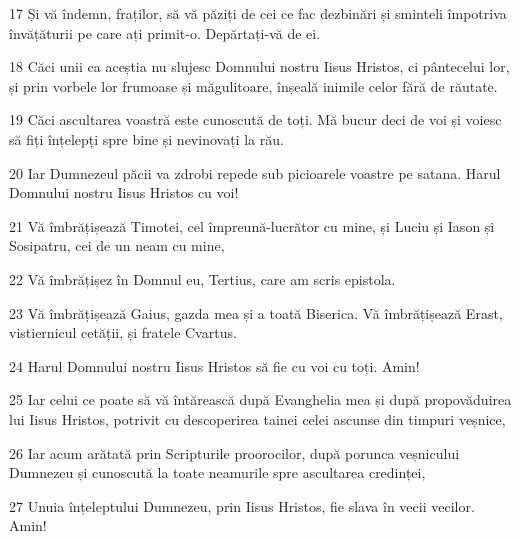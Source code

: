 \par 17 Și vă îndemn, fraților, să vă păziți de cei ce fac dezbinări și sminteli împotriva învățăturii pe care ați primit-o. Depărtați-vă de ei.
\par 18 Căci unii ca aceștia nu slujesc Domnului nostru Iisus Hristos, ci pântecelui lor, și prin vorbele lor frumoase și măgulitoare, înșeală inimile celor fără de răutate.
\par 19 Căci ascultarea voastră este cunoscută de toți. Mă bucur deci de voi și voiesc să fiți înțelepți spre bine și nevinovați la rău.
\par 20 Iar Dumnezeul păcii va zdrobi repede sub picioarele voastre pe satana. Harul Domnului nostru Iisus Hristos cu voi!
\par 21 Vă îmbrățișează Timotei, cel împreună-lucrător cu mine, și Luciu și Iason și Sosipatru, cei de un neam cu mine,
\par 22 Vă îmbrățișez în Domnul eu, Tertius, care am scris epistola.
\par 23 Vă îmbrățișează Gaius, gazda mea și a toată Biserica. Vă îmbrățișează Erast, vistiernicul cetății, și fratele Cvartus.
\par 24 Harul Domnului nostru Iisus Hristos să fie cu voi cu toți. Amin!
\par 25 Iar celui ce poate să vă întărească după Evanghelia mea și după propovăduirea lui Iisus Hristos, potrivit cu descoperirea tainei celei ascunse din timpuri veșnice,
\par 26 Iar acum arătată prin Scripturile proorocilor, după porunca veșnicului Dumnezeu și cunoscută la toate neamurile spre ascultarea credinței,
\par 27 Unuia înțeleptului Dumnezeu, prin Iisus Hristos, fie slava în vecii vecilor. Amin!


